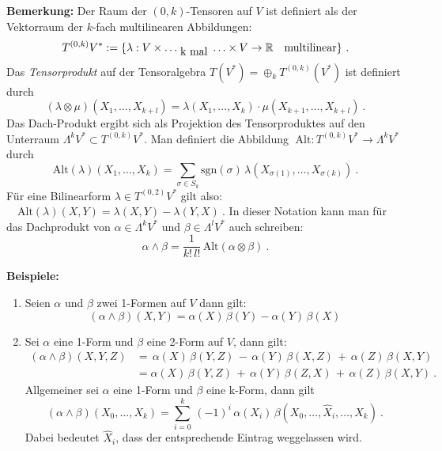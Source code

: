 \documentclass[12pt,a4paper]{article}
\def\R{\mathbb{R}}
\def\sgn{\mathrm{sgn}}
\begin{document}
\bigskip

{\bf Bemerkung:}
Der Raum der $(0,k)$-Tensoren auf $V$ ist definiert als der Vektorraum der $k$-fach multilinearen Abbildungen:
$$
T^{(0,k)} V^* := \{\lambda : V \times  \ldots_{\mbox{\;k mal\;}} \ldots\times  V \rightarrow \R \quad \mbox{multilinear}\} \ .
$$
Das {\it Tensorprodukt} auf der Tensoralgebra $T(V^*) = \oplus_k T^{(0,k)}(V^*)$ ist definiert durch
$$
(\lambda \otimes \mu)(X_1, \ldots, X_{k+l}) = \lambda(X_1, \ldots, X_k) \cdot \mu (X_{k+1}, \ldots, X_{k+l}) \ .
$$
Das Dach-Produkt ergibt sich als Projektion des Tensorproduktes auf den Unterraum
$\Lambda^k V^* \subset T^{(0,k)} V^*$. Man definiert die Abbildung
$\;\mathrm{Alt}: T^{(0,k)}V^* \rightarrow \Lambda^k V^* $ durch
$$
\mathrm{Alt}(\lambda)(X_1, \ldots, X_k )
=
\sum_{\sigma \in S_k} \sgn(\sigma) \, \lambda(X_{\sigma(1)}, \ldots, X_{\sigma(k)}) \ .
$$
F\"ur eine Bilinearform $\lambda \in T^{(0,2)}V^*$ gilt also:
$\quad
\mathrm{Alt}(\lambda)(X, Y) = \lambda(X, Y) - \lambda(Y,X) \ .
$
In dieser Notation kann man f\"ur das Dachprodukt von $\alpha \in \Lambda^k V^*$ und $\beta \in \Lambda^l V^*$
auch schreiben:
$$
\alpha \wedge \beta = \frac{1}{k!\,l!}\, \mathrm{Alt}(\alpha \otimes \beta) \ .
$$

\bigskip

{\bf Beispiele:}
\begin{enumerate}
\item
Seien $\alpha$ und $\beta$ zwei 1-Formen auf $V$ dann gilt:
$$
(\alpha \wedge \beta)(X, Y) = \alpha(X)\,\beta(Y) - \alpha(Y)\,\beta(X)
$$
\item
Sei $\alpha$ eine 1-Form und $\beta $ eine 2-Form auf $V$, dann gilt:
$$
\begin{array}{rl}
(\alpha \wedge \beta)(X,Y,Z) & = \,
\alpha(X)\,\beta (Y,Z) \,  -  \, \alpha(Y)\,\beta(X,Z)  \, +  \, \alpha(Z)\,\beta(X,Y)\\[1.5ex]
& =
\alpha(X)\,\beta(Y,Z)  \, + \,  \alpha(Y)\,\beta(Z,X) \,  +  \, \alpha(Z)\, \beta(X,Y) \ .
\end{array}
$$
Allgemeiner sei $\alpha$ eine 1-Form und $\beta$ eine k-Form, dann gilt
$$
(\alpha \wedge \beta)(X_0, \ldots, X_k) = \sum_{i=0}^k \, (-1)^i \,\alpha(X_i)\,\beta(X_0,\ldots, \widehat X_i, \ldots, X_k) \ .
$$
Dabei bedeutet $\widehat X_i$, dass der entsprechende Eintrag weggelassen wird.
\end{enumerate}

\bigskip
\end{document}
